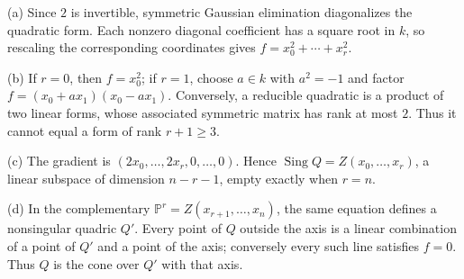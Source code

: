 (a) Since $2$ is invertible, symmetric Gaussian elimination diagonalizes the quadratic form. Each nonzero diagonal coefficient has a square root in $k$, so rescaling the corresponding coordinates gives $f=x_0^2+\cdots+x_r^2$.

(b) If $r=0$, then $f=x_0^2$; if $r=1$, choose $a\in k$ with $a^2=-1$ and factor $f=(x_0+ax_1)(x_0-ax_1)$. Conversely, a reducible quadratic is a product of two linear forms, whose associated symmetric matrix has rank at most $2$. Thus it cannot equal a form of rank $r+1\geq3$.

(c) The gradient is $(2x_0,\ldots,2x_r,0,\ldots,0)$. Hence $\operatorname{Sing}Q=Z(x_0,\ldots,x_r)$, a linear subspace of dimension $n-r-1$, empty exactly when $r=n$.

(d) In the complementary $\mathbb{P}^r=Z(x_{r+1},\ldots,x_n)$, the same equation defines a nonsingular quadric $Q'$. Every point of $Q$ outside the axis is a linear combination of a point of $Q'$ and a point of the axis; conversely every such line satisfies $f=0$. Thus $Q$ is the cone over $Q'$ with that axis.
